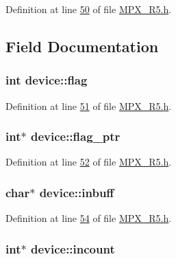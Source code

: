 Definition at line \hyperlink{_m_p_x___r5_8h_source_l00050}{50} of file \hyperlink{_m_p_x___r5_8h_source}{MPX\_\-R5.h}.



\subsection{Field Documentation}
\hypertarget{structdevice_ac2d4a1d39c1a5a858d88f2482d6900c8}{
\subsubsection[{flag}]{\setlength{\rightskip}{0pt plus 5cm}int {\bf device::flag}}}
\label{structdevice_ac2d4a1d39c1a5a858d88f2482d6900c8}


Definition at line \hyperlink{_m_p_x___r5_8h_source_l00051}{51} of file \hyperlink{_m_p_x___r5_8h_source}{MPX\_\-R5.h}.

\hypertarget{structdevice_aa14e67b7bd4e2bc5751268f0be91983f}{
\subsubsection[{flag\_\-ptr}]{\setlength{\rightskip}{0pt plus 5cm}int$\ast$ {\bf device::flag\_\-ptr}}}
\label{structdevice_aa14e67b7bd4e2bc5751268f0be91983f}


Definition at line \hyperlink{_m_p_x___r5_8h_source_l00052}{52} of file \hyperlink{_m_p_x___r5_8h_source}{MPX\_\-R5.h}.

\hypertarget{structdevice_a031f8856932341c5b5bf979b4da0d5df}{
\subsubsection[{inbuff}]{\setlength{\rightskip}{0pt plus 5cm}char$\ast$ {\bf device::inbuff}}}
\label{structdevice_a031f8856932341c5b5bf979b4da0d5df}


Definition at line \hyperlink{_m_p_x___r5_8h_source_l00054}{54} of file \hyperlink{_m_p_x___r5_8h_source}{MPX\_\-R5.h}.

\hypertarget{structdevice_ab46085fdbca4da85dfbbbf7baafc4612}{
\subsubsection[{incount}]{\setlength{\rightskip}{0pt plus 5cm}int$\ast$ {\bf device::incount}}}
\label{structdevice_ab46085fdbca4da85dfbbbf7baafc4612}


